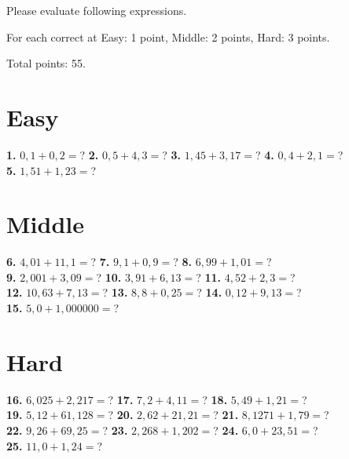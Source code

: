 \documentclass[a4paper]{article}
\begin{document}
\begin{Large}

Please evaluate following expressions.

For each correct at Easy: 1 point, Middle: 2 points, Hard: 3 points.

Total points: 55.

\section* {Easy}
		
\textbf{1.} $0,1 + 0,2=$? \hspace{0.3cm}
\textbf{2.} $0,5 + 4,3=$? \hspace{0.3cm}
\textbf{3.} $1,45 + 3,17=$? \hspace{0.3cm}
\textbf{4.} $0,4 + 2,1=$? \\[0.75cm]
\textbf{5.} $1,51 + 1,23=$?


\section* {Middle}
		
\textbf{6.} $4,01 + 11,1=$? \hspace{0.3cm}
\textbf{7.} $9,1 + 0,9=$? \hspace{0.3cm}
\textbf{8.} $6,99 + 1,01=$? \\[0.75cm]
\textbf{9.} $2,001 + 3,09=$? \hspace{0.3cm}
\textbf{10.} $3,91 + 6,13=$? \hspace{0.3cm} 
\textbf{11.} $4,52 + 2,3=$? \\[0.75cm]
\textbf{12.} $10,63 + 7,13=$? \hspace{0.3cm}
\textbf{13.} $8,8 + 0,25=$? \hspace{0.3cm}
\textbf{14.} $0,12 + 9,13=$? \\[0.75cm]
\textbf{15.} $5,0 + 1,000000=$?
		
\section* {Hard}

\textbf{16.} $6,025 + 2,217=$? \hspace{0.3cm}
\textbf{17.} $7,2 + 4,11=$? \hspace{0.3cm}
\textbf{18.} $5,49 + 1,21=$? \\[0.75cm]
\textbf{19.} $5,12 + 61,128=$? \hspace{0.3cm}
\textbf{20.} $2,62 + 21,21=$? \hspace{0.3cm}
\textbf{21.} $8,1271 + 1,79=$? \\[0.75cm]
\textbf{22.} $9,26 + 69,25=$? \hspace{0.3cm}
\textbf{23.} $2,268 + 1,202=$?  \hspace{0.3cm}
\textbf{24.} $6,0 + 23,51=$? \\[0.75cm]
\textbf{25.} $11,0 + 1,24=$? 

\end{Large}
\end{document}
